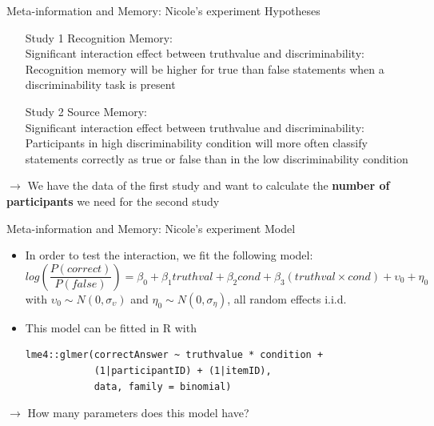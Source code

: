\documentclass[aspectratio=169]{beamer}
\begin{document}
\begin{frame}{Meta-information and Memory: Nicole's experiment}
  {Hypotheses}
  \begin{itemize}
    \item[Study 1] Recognition Memory:\\
      Significant interaction effect between truthvalue and
      discriminability: Recognition memory will be higher for true than
      false statements when a discriminability task is present
    \item[Study 2] Source Memory:\\
      Significant interaction effect between truthvalue and
      discriminability: Participants in high discriminability condition
      will more often classify statements correctly as true or false than
      in the low discriminability condition
  \end{itemize}
  \vspace{.5cm}
  \pause
  $\to$ We have the data of the first study and want to calculate the
  {\bf number of participants} we need for the second study
\end{frame}


\begin{frame}[fragile]{Meta-information and Memory: Nicole's experiment}
  {Model}
  \begin{itemize}
    \item In order to test the interaction, we fit the following model:
  \begin{equation*}
    log\left(\frac{P(correct)}{P(false)}\right) = \beta_0 + \beta_1 truthval + \beta_2 cond +
    \beta_3 (truthval \times cond) + \upsilon_0 + \eta_0
  \end{equation*}
  with $\upsilon_0 \sim N(0, \sigma_{\upsilon})$ and $\eta_0 \sim N(0,
  \sigma_{\eta})$, all random effects i.i.d.
\item This model can be fitted in R with
  \begin{lstlisting}[style = plain, frame = single]
lme4::glmer(correctAnswer ~ truthvalue * condition + 
            (1|participantID) + (1|itemID),
            data, family = binomial)
\end{lstlisting}
  \end{itemize}

  \pause
  $\to$ How many parameters does this model have?
\end{frame}
\end{document}
